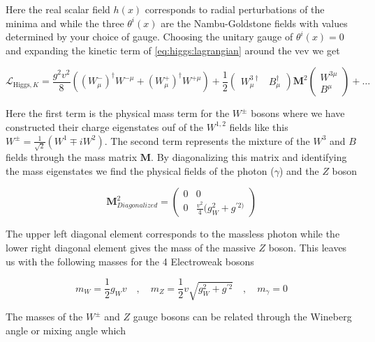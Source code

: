 Here the real scalar field $h(x)$ corresponds to radial perturbations of the
minima and while the three $\theta^{i}(x)$ are the Nambu-Goldstone fields with
values determined by your choice of gauge.  Choosing the unitary gauge of
$\theta^{i}(x) = 0$ and expanding the kinetic term of
\cref{eq:higgs:lagrangian} around the vev we get

\begin{equation} \label{eq:higgs:boson_masses}
\mathcal{L}_{\text{Higgs},K} = \frac{g^{2}v^{2}}{8} \left(
(W_{\mu}^{-})^{\dagger}W^{-\mu} + (W_{\mu}^{+})^{\dagger}W^{+\mu} \right) +
\frac{1}{2} \left( \begin{matrix} W_{\mu}^{3\dagger} & B_{\mu}^{\dagger}
\end{matrix} \right) \boldsymbol{M}^{2} \left( \begin{matrix} W^{3\mu} \\ B^{\mu}
\end{matrix} \right) + \ldots 
\end{equation}

Here the first term is the physical mass term for the $W^{\pm}$ bosons where we
have constructed their charge eigenstates ouf of the $W^{1,2}$ fields like this
$W^{\pm} = \frac{1}{\sqrt{2}}(W^{1} \mp iW^{2})$.  The second term represents the
mixture of the $W^{3}$ and $B$ fields through the mass matrix $\boldsymbol{M}$.
By diagonalizing this matrix and identifying the mass eigenstates we find the
physical fields of the photon ($\gamma$) and the $Z$ boson


\begin{equation}
\boldsymbol{M}_{Diagonalized}^{2} = \left( \begin{matrix} 0 & 0 \\ 0 &
\frac{v^{2}}{4}(g_{W}^{2} + g^{'2)}   \end{matrix} \right)
\end{equation}

The upper left diagonal element corresponds to the massless photon
while the lower right diagonal element gives the mass of the massive $Z$ boson.
This leaves us with the following masses for the 4 Electroweak bosons

\begin{equation}
m_{W} = \frac{1}{2}g_{W}v \quad , \quad m_Z = \frac{1}{2}v\sqrt{g_{W}^{2} + g^{'2}}
\quad , \quad m_\gamma = 0
\end{equation}

The masses of the $W^{\pm}$ and $Z$ gauge bosons can be related through the
Wineberg angle or mixing angle which

